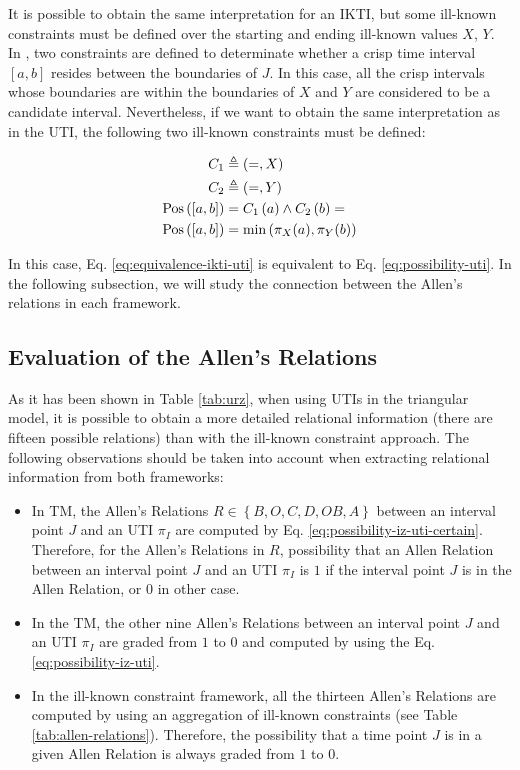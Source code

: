It is possible to obtain the same interpretation for an IKTI, but some ill-known constraints must be defined over the starting and ending ill-known values $X$, $Y$. In \cite{Pons2011}, two constraints are defined to determinate whether a crisp time interval $[a, b]$ resides between the boundaries of $J$. In this case, all the crisp intervals whose boundaries are within the boundaries of $X$ and $Y$ are considered to be a candidate interval. Nevertheless, if we want to obtain the same interpretation as in the UTI, the following two ill-known constraints must be defined:

\begin{align}
 \label{eq:ikc-ikti-uti}
C_1 &\triangleq \left(=, X \right) \\
C_2 &\triangleq \left(=, Y \right)\\
\operatorname{Pos} \left(\left[a, b\right] \right) &= C_1 \left(a \right) \wedge C_2\left(b \right) =\\
\label{eq:equivalence-ikti-uti}
\operatorname{Pos} \left(\left[a, b\right] \right) &= \min \left( \pi_X(a), \pi_Y(b) \right)
\end{align}

In this case, Eq. \eqref{eq:equivalence-ikti-uti} is equivalent to Eq. \eqref{eq:possibility-uti}.
In the following subsection, we will study the connection between the Allen's relations in each framework.

\subsection{\label{subsec:eval-allen-relations}Evaluation of the Allen's Relations}
As it has been shown in Table \ref{tab:urz}, when using UTIs in the triangular model, it is possible to obtain a more detailed relational information (there are fifteen possible relations) than with the ill-known constraint approach. The following observations should be taken into account when extracting relational information from both frameworks:

\begin{itemize}
 \item In TM, the Allen's Relations $R \in \left \lbrace B, O, C, D, OB, A \right \rbrace$ between an interval point $J$  and an UTI $\pi_I$ are computed by Eq. \eqref{eq:possibility-iz-uti-certain}. Therefore, for the Allen's Relations in $R$, 
 possibility that an Allen Relation between an interval point $J$  and an UTI $\pi_I$ is $1$ if the interval point $J$ is in the Allen Relation, or $0$ in other case.
\item In the TM, the other nine Allen's Relations between an interval point $J$ and an UTI $\pi_I$ are graded from $1$ to $0$ and computed by using the Eq. \eqref{eq:possibility-iz-uti}. 
\item In the ill-known constraint framework, all the thirteen Allen's Relations are computed by using an aggregation of ill-known constraints (see Table \ref{tab:allen-relations}). Therefore, the possibility that a time point $J$ is in a given Allen Relation is always graded from $1$ to $0$.
\end{itemize}

